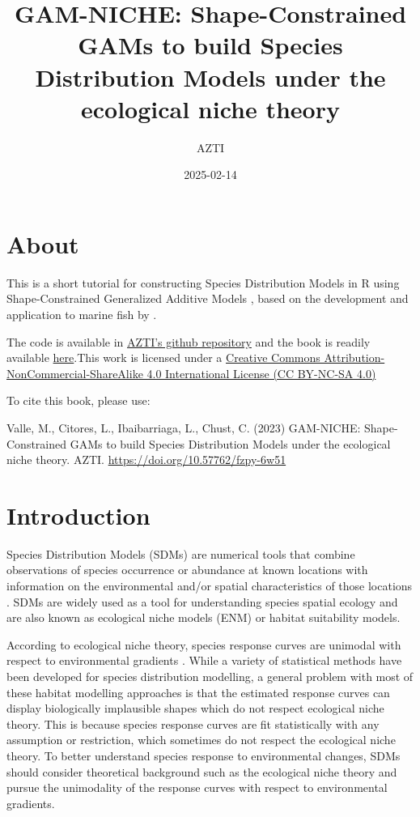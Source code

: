 \documentclass[
]{book}
\title{GAM-NICHE: Shape-Constrained GAMs to build Species Distribution Models under the ecological niche theory}
\author{AZTI}
\date{2025-02-14}
\begin{document}
\maketitle

{
\setcounter{tocdepth}{1}
\tableofcontents
}
\chapter*{About}\label{about}

This is a short tutorial for constructing Species Distribution Models in R using Shape-Constrained Generalized Additive Models \citep{pya_etal_2015}, based on the development and application to marine fish by \citet{citores_etal_2020}.

The code is available in \href{https://github.com/Fundacion-AZTI/gam-niche}{AZTI's github repository} and the book is readily available \href{https://fundacion-azti.github.io/gam-niche/}{here}.This work is licensed under a \href{https://creativecommons.org/licenses/by-nc-sa/4.0/}{Creative Commons Attribution-NonCommercial-ShareAlike 4.0 International License (CC BY-NC-SA 4.0)}

To cite this book, please use:

Valle, M., Citores, L., Ibaibarriaga, L., Chust, C. (2023) GAM-NICHE: Shape-Constrained GAMs to build Species Distribution Models under the ecological niche theory. AZTI. \url{https://doi.org/10.57762/fzpy-6w51}

\chapter{Introduction}\label{introduction}

Species Distribution Models (SDMs) are numerical tools that combine observations of species occurrence or abundance at known locations with information on the environmental and/or spatial characteristics of those locations \citep{elith_etal_2009}. SDMs are widely used as a tool for understanding species spatial ecology and are also known as ecological niche models (ENM) or habitat suitability models.

According to ecological niche theory, species response curves are unimodal with respect to environmental gradients \citep{hutchinson_1957}. While a variety of statistical methods have been developed for species distribution modelling, a general problem with most of these habitat modelling approaches is that the estimated response curves can display biologically implausible shapes which do not respect ecological niche theory. This is because species response curves are fit statistically with any assumption or restriction, which sometimes do not respect the ecological niche theory. To better understand species response to environmental changes, SDMs should consider theoretical background such as the ecological niche theory and pursue the unimodality of the response curves with respect to environmental gradients.
\end{document}
